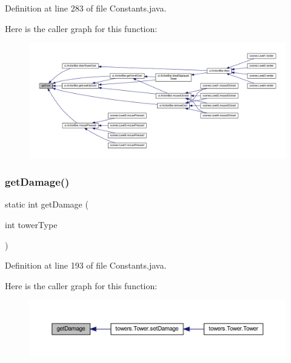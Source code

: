 Definition at line 283 of file Constants.\+java.

Here is the caller graph for this function\+:\nopagebreak
\begin{figure}[H]
\begin{center}
\leavevmode
\includegraphics[width=350pt]{classhelpz_1_1_constants_1_1_towers_affe7d154c2065c3c8eea74993d932c2c_icgraph}
\end{center}
\end{figure}
\mbox{\label{classhelpz_1_1_constants_1_1_towers_af342377601401ede304d4f859942472c}} 
\subsubsection{\texorpdfstring{get\+Damage()}{getDamage()}}
{\footnotesize\ttfamily static int get\+Damage (\begin{DoxyParamCaption}\item[{int}]{tower\+Type }\end{DoxyParamCaption})\hspace{0.3cm}{\ttfamily [static]}}



Definition at line 193 of file Constants.\+java.

Here is the caller graph for this function\+:\nopagebreak
\begin{figure}[H]
\begin{center}
\leavevmode
\includegraphics[width=350pt]{classhelpz_1_1_constants_1_1_towers_af342377601401ede304d4f859942472c_icgraph}
\end{center}
\end{figure}
\mbox{\label{classhelpz_1_1_constants_1_1_towers_a514d43d9440f939e8a4d021a01049424}} 
